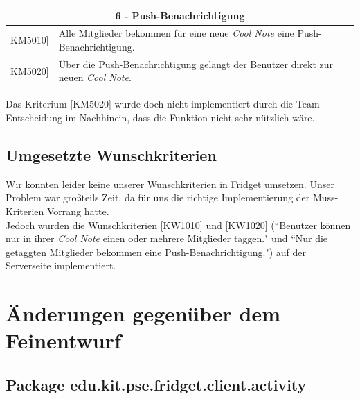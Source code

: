 \documentclass[a4paper]{scrreprt}
\begin{document}
		\vspace{5mm}
		
		\begin{table}[h!]
			\centering
			\label{my-label}
			\begin{tabular}{p{2cm}p{12cm}}
				
				\multicolumn{2}{c}{\textbf{6 - Push-Benachrichtigung}} \\ \hline
				\centering{[}KM5010{]} & Alle Mitglieder bekommen für eine neue \textit{Cool Note} eine Push-Benachrichtigung.\\
				\centering{[}KM5020{]}& Über die Push-Benachrichtigung gelangt der Benutzer direkt zur neuen \textit{Cool Note}.                               \\
				
				\hline
			\end{tabular}
		\end{table}
	 Das Kriterium {[}KM5020{]} wurde doch nicht implementiert durch die Team-Entscheidung im Nachhinein, dass die Funktion nicht sehr nützlich wäre. 
	\section{Umgesetzte Wunschkriterien}
	Wir konnten leider keine unserer Wunschkriterien in Fridget umsetzen. Unser Problem war großteils Zeit, da für uns die richtige Implementierung der Muss-Kriterien Vorrang hatte.\\
	Jedoch wurden die Wunschkriterien  {[}KW1010{]} und {[}KW1020{]} (``Benutzer können nur in ihrer \textit{Cool Note} einen oder mehrere Mitglieder taggen." und ``Nur die getaggten Mitglieder bekommen eine Push-Benachrichtigung.") auf der Serverseite implementiert.\\
	
	\newpage
	
	\chapter{Änderungen gegenüber dem Feinentwurf}
	
	\section{Package edu.kit.pse.fridget.client.activity}
\end{document}
